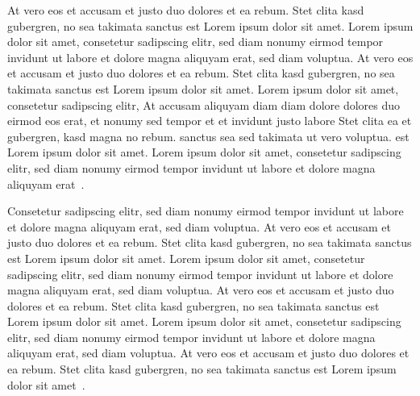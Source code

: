 At vero eos et accusam et justo duo dolores et ea rebum. Stet clita kasd
gubergren, no sea takimata sanctus est Lorem ipsum dolor sit amet. Lorem ipsum
dolor sit amet, consetetur sadipscing elitr,  sed diam nonumy eirmod tempor
invidunt ut labore et dolore magna aliquyam erat, sed diam voluptua. At vero
eos et accusam et justo duo dolores et ea rebum. Stet clita kasd gubergren, no
sea takimata sanctus est Lorem ipsum dolor sit amet. Lorem ipsum dolor sit
amet, consetetur sadipscing elitr,  At accusam aliquyam diam diam dolore
dolores duo eirmod eos erat, et nonumy sed tempor et et invidunt justo labore
Stet clita ea et gubergren, kasd magna no rebum. sanctus sea sed takimata ut
vero voluptua. est Lorem ipsum dolor sit amet. Lorem ipsum dolor sit amet,
consetetur sadipscing elitr,  sed diam nonumy eirmod tempor invidunt ut labore
et dolore magna aliquyam erat~\cite{may:arpcd}.

Consetetur sadipscing elitr,  sed diam nonumy eirmod tempor invidunt ut labore
et dolore magna aliquyam erat, sed diam voluptua. At vero eos et accusam et
justo duo dolores et ea rebum. Stet clita kasd gubergren, no sea takimata
sanctus est Lorem ipsum dolor sit amet. Lorem ipsum dolor sit amet, consetetur
sadipscing elitr,  sed diam nonumy eirmod tempor invidunt ut labore et dolore
magna aliquyam erat, sed diam voluptua. At vero eos et accusam et justo duo
dolores et ea rebum. Stet clita kasd gubergren, no sea takimata sanctus est
Lorem ipsum dolor sit amet. Lorem ipsum dolor sit amet, consetetur sadipscing
elitr,  sed diam nonumy eirmod tempor invidunt ut labore et dolore magna
aliquyam erat, sed diam voluptua. At vero eos et accusam et justo duo dolores
et ea rebum. Stet clita kasd gubergren, no sea takimata sanctus est Lorem ipsum
dolor sit amet~\cite{mc:tmcds}.
